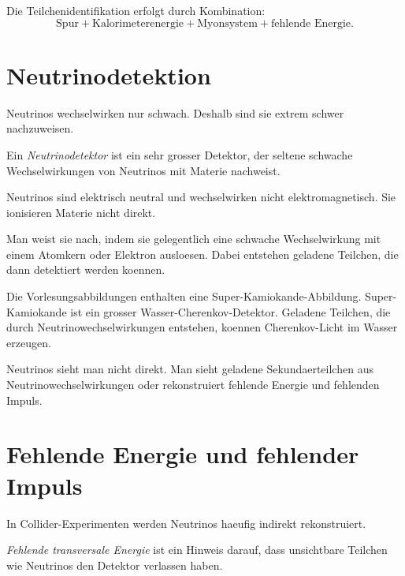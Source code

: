 \begin{examtipbox}
Die Teilchenidentifikation erfolgt durch Kombination:
\[
    \text{Spur}
    +
    \text{Kalorimeterenergie}
    +
    \text{Myonsystem}
    +
    \text{fehlende Energie}.
\]
\end{examtipbox}

\section{Neutrinodetektion}

Neutrinos wechselwirken nur schwach.
Deshalb sind sie extrem schwer nachzuweisen.

\begin{definitionbox}
Ein \emph{Neutrinodetektor} ist ein sehr grosser Detektor, der seltene schwache
Wechselwirkungen von Neutrinos mit Materie nachweist.
\end{definitionbox}

\begin{conceptbox}
Neutrinos sind elektrisch neutral und wechselwirken nicht elektromagnetisch.
Sie ionisieren Materie nicht direkt.

Man weist sie nach, indem sie gelegentlich eine schwache Wechselwirkung mit einem
Atomkern oder Elektron ausloesen.
Dabei entstehen geladene Teilchen, die dann detektiert werden koennen.
\end{conceptbox}

\begin{notebox}
Die Vorlesungsabbildungen enthalten eine Super-Kamiokande-Abbildung.
Super-Kamiokande ist ein grosser Wasser-Cherenkov-Detektor.
Geladene Teilchen, die durch Neutrinowechselwirkungen entstehen, koennen Cherenkov-Licht
im Wasser erzeugen.
\end{notebox}

\begin{examtipbox}
Neutrinos sieht man nicht direkt.
Man sieht geladene Sekundaerteilchen aus Neutrinowechselwirkungen oder rekonstruiert
fehlende Energie und fehlenden Impuls.
\end{examtipbox}

\section{Fehlende Energie und fehlender Impuls}

In Collider-Experimenten werden Neutrinos haeufig indirekt rekonstruiert.

\begin{definitionbox}
\emph{Fehlende transversale Energie} ist ein Hinweis darauf, dass unsichtbare Teilchen
wie Neutrinos den Detektor verlassen haben.
\end{definitionbox}

